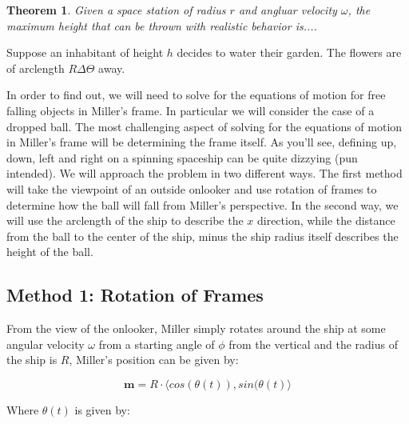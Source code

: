 \documentclass{amsart}
\newtheorem{theorem}{Theorem}[section]
\renewcommand{\vec}{\textbf}
\theoremstyle{definition}
\begin{document}
\begin{theorem}
  Given a space station of radius $r$ and angluar velocity $\omega$, the maximum height that can be thrown with realistic behavior is....
\end{theorem}





Suppose an inhabitant of height $h$ decides to water their garden. The flowers are of arclength $R\Delta\Theta$ away. 

In order to find out, we will need to solve for the equations of
motion for free falling objects in Miller's frame. In particular we
will consider the case of a dropped ball. The most challenging aspect
of solving for the equations of motion in Miller's frame will be
determining the frame itself. As you'll see, defining up, down, left
and right on a spinning spaceship can be quite dizzying (pun
intended). We will approach the problem in two different ways. The
first method will take the viewpoint of an outside onlooker and use
rotation of frames to determine how the ball will fall from Miller's
perspective. In the second way, we will use the arclength of the ship
to describe the $x$ direction, while the distance from the ball to the
center of the ship, minus the ship radius itself describes the height
of the ball.

\subsection*{Method 1: Rotation of Frames}

From the view of the onlooker, Miller simply rotates around the ship at some angular velocity $\omega$ from a starting angle of $\phi$ from the vertical and the radius of the ship is $R$, Miller's position can be given by:

\begin{equation}\label{eq:MillerPosition}
    \vec{m}=R\cdot \langle cos(\theta(t)),sin(\theta (t)\rangle
\end{equation}

Where $\theta (t)$ is given by:
\end{document}
